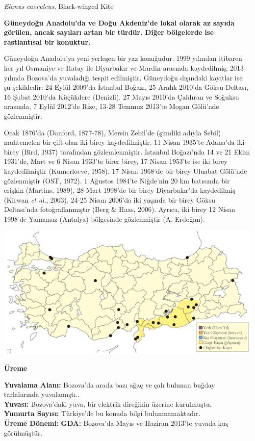 \documentclass[
  a4paper,
  DIV=11,
  numbers=noendperiod]{scrreprt}
\begin{document}
\emph{Elanus caeruleus}, Black-winged Kite

\textbf{Güneydoğu Anadolu'da ve Doğu Akdeniz'de lokal olarak az sayıda
görülen, ancak sayıları artan bir türdür. Diğer bölgelerde ise
rastlantısal bir konuktur.}

Güneydoğu Anadolu'ya yeni yerleşen bir yaz konuğudur. 1999 yılından
itibaren her yıl Osmaniye ve Hatay ile Diyarbakır ve Mardin arasında
kaydedilmiş, 2013 yılında Bozova'da yuvaladığı tespit edilmiştir.
Güneydoğu dışındaki kayıtlar ise şu şekildedir: 24 Eylül 2009'da
İstanbul Boğazı, 25 Aralık 2010'da Göksu Deltası, 16 Şubat 2010'da
Küçükdere (Denizli), 27 Mayıs 2010'da Çaldıran ve Soğuksu arasında, 7
Eylül 2012'de Rize, 13-28 Temmuz 2013'te Mogan Gölü'nde gözlenmiştir.

Ocak 1876'da (Danford, 1877-78), Mersin Zebil'de (şimdiki adıyla Sebil)
muhtemelen bir çift olan iki birey kaydedilmiştir. 11 Nisan 1935'te
Adana'da iki birey (Bird, 1937) tarafından gözlemlenmiştir. İstanbul
Boğazı'nda 14 ve 21 Ekim 1931'de, Mart ve 6 Nisan 1933'te birer birey,
17 Nisan 1953'te ise iki birey kaydedilmiştir (Kumerloeve, 1958). 17
Nisan 1968'de bir birey Uluabat Gölü'nde gözlenmiştir (OST, 1972). 1
Ağustos 1984'te Niğde'nin 20 km batısında bir erişkin (Martins, 1989),
28 Mart 1998'de bir birey Diyarbakır'da kaydedilmiş (Kirwan \emph{et
al.}, 2003), 24-25 Nisan 2006'da iki yaşında bir birey Göksu Deltası'nda
fotoğraflanmıştır (Berg \& Haas, 2006). Ayrıca, iki birey 12 Nisan
1998'de Yamansız (Antalya) bölgesinde gözlenmiştir (A. Erdoğan).

\includegraphics{images/harita_Page_082.png}

\textbf{Üreme}

\textbf{Yuvalama Alanı:} Bozova'da arada bazı ağaç ve çalı bulunan
buğday tarlalarında yuvalamıştı..\\
\textbf{Yuvası:} Bozova'daki yuva, bir elektrik direğinin üzerine
kurulmuştu.\\
\textbf{Yumurta Sayısı:} Türkiye'de bu konuda bilgi bulunmamaktadır.\\
\textbf{Üreme Dönemi:} \textbf{GDA:} Bozova'da Mayıs ve Haziran 2013'te
yuvada kuş görülmüştür.
\end{document}
